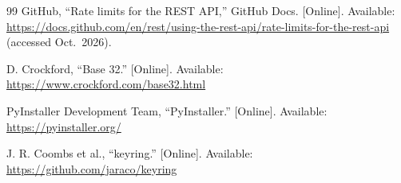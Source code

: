 \begin{thebibliography}{99}
 GitHub, ``Rate limits for the REST API,'' GitHub Docs. [Online]. Available:
\url{https://docs.github.com/en/rest/using-the-rest-api/rate-limits-for-the-rest-api}
(accessed Oct.\ 2026).

 D. Crockford, ``Base 32.'' [Online]. Available:
\url{https://www.crockford.com/base32.html}

 PyInstaller Development Team, ``PyInstaller.'' [Online]. Available:
\url{https://pyinstaller.org/}

 J. R. Coombs et al., ``keyring.'' [Online]. Available:
\url{https://github.com/jaraco/keyring}

\end{thebibliography}
\endgroup
